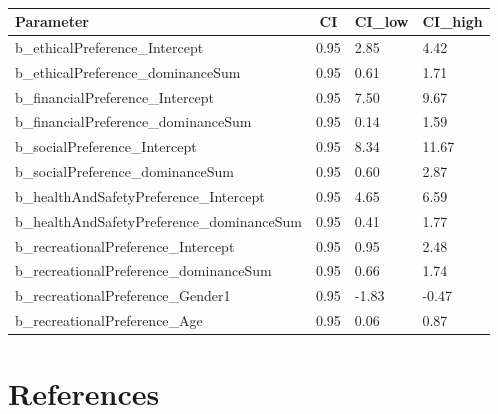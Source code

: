\documentclass[
  donotrepeattitle,doc, 12pt, a4paper,floatsintext]{apa7}
\begin{document}
\begin{table}[tbp]

\begin{center}
\begin{threeparttable}

\caption{\label{tab:unnamed-chunk-8}}

\begin{tabular}{llll}
\toprule
Parameter & \multicolumn{1}{c}{CI} & \multicolumn{1}{c}{CI\_low} & \multicolumn{1}{c}{CI\_high}\\
\midrule
b\_ethicalPreference\_Intercept & 0.95 & 2.85 & 4.42\\
b\_ethicalPreference\_dominanceSum & 0.95 & 0.61 & 1.71\\
b\_financialPreference\_Intercept & 0.95 & 7.50 & 9.67\\
b\_financialPreference\_dominanceSum & 0.95 & 0.14 & 1.59\\
b\_socialPreference\_Intercept & 0.95 & 8.34 & 11.67\\
b\_socialPreference\_dominanceSum & 0.95 & 0.60 & 2.87\\
b\_healthAndSafetyPreference\_Intercept & 0.95 & 4.65 & 6.59\\
b\_healthAndSafetyPreference\_dominanceSum & 0.95 & 0.41 & 1.77\\
b\_recreationalPreference\_Intercept & 0.95 & 0.95 & 2.48\\
b\_recreationalPreference\_dominanceSum & 0.95 & 0.66 & 1.74\\
b\_recreationalPreference\_Gender1 & 0.95 & -1.83 & -0.47\\
b\_recreationalPreference\_Age & 0.95 & 0.06 & 0.87\\
\bottomrule
\end{tabular}

\end{threeparttable}
\end{center}

\end{table}

\hypertarget{references}{%
\section{References}\label{references}}

\begingroup
\setlength{\parindent}{-0.5in}
\setlength{\leftskip}{0.5in}
\end{document}
